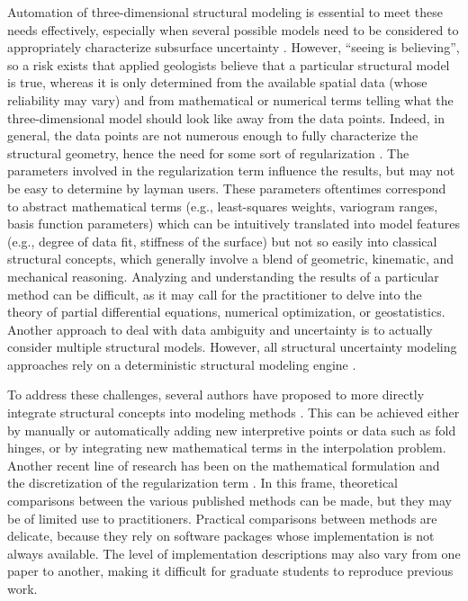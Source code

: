 \documentclass[preprint]{ring20}
\begin{document}
Automation of three-dimensional structural modeling is essential to meet these needs effectively, especially when several possible models need to be considered to appropriately characterize subsurface uncertainty \citep{Wellmann2018AiG}. However, ``seeing is believing'', so a risk exists that applied geologists believe that a particular structural model is true, whereas it is only determined from the available spatial data (whose reliability may vary) and from mathematical or numerical terms telling what the three-dimensional model should look like away from the data points. Indeed, in general, the data points are not numerous enough to fully characterize the structural geometry, hence the need for some sort of regularization \citep[e.g.,][]{Renaudeau2019MG}. The parameters involved in the regularization term influence the results, but may not be easy to determine by layman users. These parameters oftentimes correspond to abstract mathematical terms (e.g., least-squares weights, variogram ranges, basis function parameters) which can be intuitively translated into model features (e.g., degree of data fit, stiffness of the surface) but not so easily into classical structural concepts, which generally involve a blend of geometric, kinematic, and mechanical reasoning. Analyzing and understanding the results of a particular method can be difficult, as it may call for the practitioner to delve into the theory of partial differential equations, numerical optimization, or geostatistics. Another approach to deal with data ambiguity and uncertainty is to actually consider multiple structural models. However, all structural uncertainty modeling approaches rely on a deterministic structural modeling engine \citep[see ][ and references therein]{Wellmann2018AiG}.  

To address these challenges, several authors have proposed to more directly integrate structural concepts into modeling methods \citep{DeKemp2003G,Maxelon2009CG,MassiotGM2010,Laurent2016EaPSL,Grose2017JSG,Grose2018JGRSE,Grose2019JoSG,Pizzella2022MG}. This can be achieved either by manually or automatically adding new interpretive points or data such as fold hinges, or by integrating new mathematical terms in the interpolation problem. Another recent line of research has been on the mathematical formulation and the discretization of the regularization term \citep{Laurent2016MG,Martin2017CG,Renaudeau2019MG,Irakarama2021MG,Irakarama2022CD}. In this frame, theoretical comparisons between the various published methods can be made, but they may be of limited use to practitioners. Practical comparisons between methods are delicate, because they rely on software packages whose implementation is not always available. The level of implementation descriptions may also vary from one paper to another, making it difficult for graduate students to reproduce previous work. 
\end{document}
